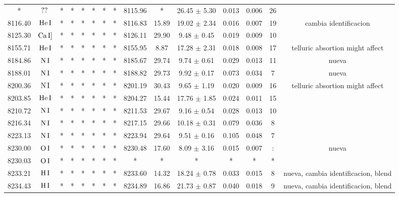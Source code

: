 \documentclass{article}
\begin{document}
\begin{table*}
\begin{adjustbox}{width=\textwidth}
\begin{tabular}{ccccccccccccccc}
* & $\mbox{??}\thinspace \mbox{}$ & * & * & * & * & * & * & 8115.96 & * & 26.45 $\pm$ 5.30 & 0.013 & 0.006 & 26 &  \\
8116.40 & $\mbox{He}\thinspace \mbox{I}$ & * & * & * & * & * & * & 8116.83 & 15.89 & 19.02 $\pm$ 2.34 & 0.016 & 0.007 & 19 &  cambia identificacion \\
8125.30 & $\mbox{Ca}\thinspace \mbox{I]}$ & * & * & * & * & * & * & 8126.11 & 29.90 & 9.48 $\pm$ 0.45 & 0.019 & 0.009 & 10 &  \\
8155.71 & $\mbox{He}\thinspace \mbox{I}$ & * & * & * & * & * & * & 8155.95 & 8.87 & 17.28 $\pm$ 2.31 & 0.018 & 0.008 & 17 &  telluric absortion might affect \\
8184.86 & $\mbox{N}\thinspace \mbox{I}$ & * & * & * & * & * & * & 8185.67 & 29.74 & 9.74 $\pm$ 0.61 & 0.029 & 0.013 & 11 &  nueva \\
8188.01 & $\mbox{N}\thinspace \mbox{I}$ & * & * & * & * & * & * & 8188.82 & 29.73 & 9.92 $\pm$ 0.17 & 0.073 & 0.034 & 7 &  nueva \\
8200.36 & $\mbox{N}\thinspace \mbox{I}$ & * & * & * & * & * & * & 8201.19 & 30.43 & 9.65 $\pm$ 1.19 & 0.020 & 0.009 & 16 &  telluric absortion might affect \\
8203.85 & $\mbox{He}\thinspace \mbox{I}$ & * & * & * & * & * & * & 8204.27 & 15.44 & 17.76 $\pm$ 1.85 & 0.024 & 0.011 & 15 &  \\
8210.72 & $\mbox{N}\thinspace \mbox{I}$ & * & * & * & * & * & * & 8211.53 & 29.67 & 9.16 $\pm$ 0.54 & 0.028 & 0.013 & 10 &  \\
8216.34 & $\mbox{N}\thinspace \mbox{I}$ & * & * & * & * & * & * & 8217.15 & 29.66 & 10.18 $\pm$ 0.31 & 0.079 & 0.036 & 8 &  \\
8223.13 & $\mbox{N}\thinspace \mbox{I}$ & * & * & * & * & * & * & 8223.94 & 29.64 & 9.51 $\pm$ 0.16 & 0.105 & 0.048 & 7 &  \\
8230.00 & $\mbox{O}\thinspace \mbox{I}$ & * & * & * & * & * & * & 8230.48 & 17.60 & 8.09 $\pm$ 3.16 & 0.015 & 0.007 & : &  nueva \\
8230.03 & $\mbox{O}\thinspace \mbox{I}$ & * & * & * & * & * & * & * & * & * & * & * & * &  \\
8233.21 & $\mbox{H}\thinspace \mbox{I}$ & * & * & * & * & * & * & 8233.60 & 14.32 & 18.24 $\pm$ 0.78 & 0.033 & 0.015 & 8 &  nueva, cambia identificacion, blend \\
8234.43 & $\mbox{H}\thinspace \mbox{I}$ & * & * & * & * & * & * & 8234.89 & 16.86 & 21.73 $\pm$ 0.87 & 0.040 & 0.018 & 9 &  nueva, cambia identificacion, blend \\

\end{tabular}
\end{adjustbox}
\end{table*}
\end{document}
